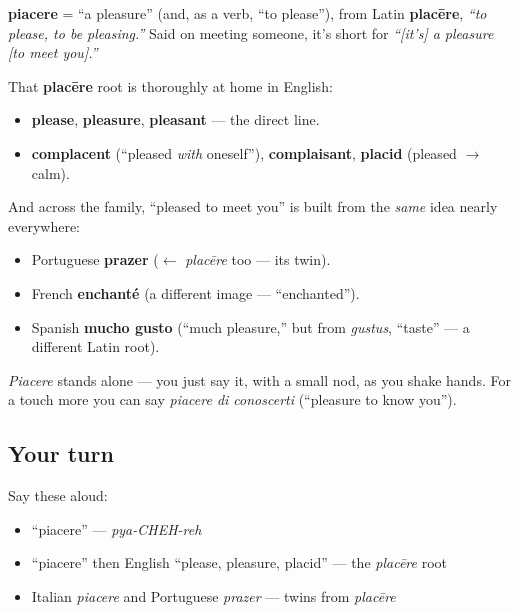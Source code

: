 \begin{cousinweb}
\textbf{piacere} = \textquotedblleft{}a pleasure\textquotedblright{} (and, as a verb, \textquotedblleft{}to please\textquotedblright{}), from Latin \textbf{placēre}, \emph{\textquotedblleft{}to please, to be pleasing.\textquotedblright{}} Said on meeting someone, it's short for \emph{\textquotedblleft{}{[}it's{]} a pleasure {[}to meet you{]}.\textquotedblright{}}

That \textbf{placēre} root is thoroughly at home in English:

\begin{itemize}
\raggedright
  \item \textbf{please}, \textbf{pleasure}, \textbf{pleasant} — the direct line.
  \item \textbf{complacent} (\textquotedblleft{}pleased \emph{with} oneself\textquotedblright{}), \textbf{complaisant}, \textbf{placid} (pleased $\to$ calm).
\end{itemize}

And across the family, \textquotedblleft{}pleased to meet you\textquotedblright{} is built from the \emph{same} idea nearly everywhere:

\begin{itemize}
\raggedright
  \item Portuguese \textbf{prazer} ($\leftarrow$ \emph{placēre} too — its twin).
  \item French \textbf{enchanté} (a different image — \textquotedblleft{}enchanted\textquotedblright{}).
  \item Spanish \textbf{mucho gusto} (\textquotedblleft{}much pleasure,\textquotedblright{} but from \emph{gustus}, \textquotedblleft{}taste\textquotedblright{} — a different Latin root).
\end{itemize}
\end{cousinweb}

\begin{grammarlens}[title={Grammar Lens: a one-word courtesy}]
\emph{Piacere} stands alone — you just say it, with a small nod, as you shake hands. For a touch more you can say \emph{piacere di conoscerti} (\textquotedblleft{}pleasure to know you\textquotedblright{}).
\end{grammarlens}

\subsection*{Your turn}
Say these aloud:

\begin{itemize}
\raggedright
  \item \textquotedblleft{}piacere\textquotedblright{} — \emph{pya-CHEH-reh}
  \item \textquotedblleft{}piacere\textquotedblright{} then English \textquotedblleft{}please, pleasure, placid\textquotedblright{} — the \emph{placēre} root
  \item Italian \emph{piacere} and Portuguese \emph{prazer} — twins from \emph{placēre}
\end{itemize}

